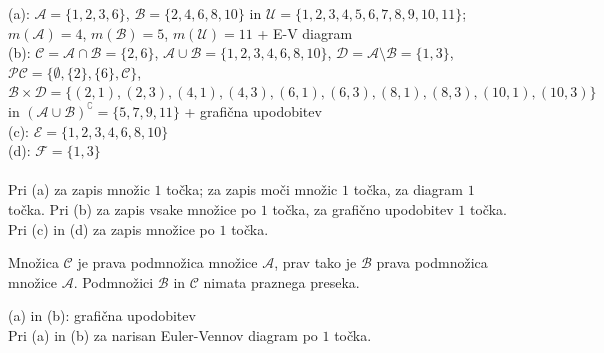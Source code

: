 \documentclass[addpoints]{exam}
\begin{document}
\begin{questions}
    \begin{solution}[12cm]
        (a): $\mathcal{A}=\{1,2,3,6\}$, $\mathcal{B}=\{2,4,6,8,10\}$ in $\mathcal{U}=\{1,2,3,4,5,6,7,8,9,10,11\}$; $m(\mathcal{A})=4$, $m(\mathcal{B})=5$, $m(\mathcal{U})=11$ + E-V diagram \\
        (b): $\mathcal{C}=\mathcal{A}\cap\mathcal{B}=\{2,6\}$, $\mathcal{A}\cup\mathcal{B}=\{1,2,3,4,6,8,10\}$, $\mathcal{D}=\mathcal{A}\setminus\mathcal{B}=\{1,3\}$, $\mathcal{PC}=\{\emptyset,\{2\},\{6\},\mathcal{C}\}$, $\mathcal{B}\times\mathcal{D}=\{(2,1),(2,3),(4,1),(4,3),(6,1),(6,3),(8,1),(8,3),(10,1),(10,3)\}$ in $(\mathcal{A}\cup\mathcal{B})^\complement=\{5,7,9,11\}$ + grafična upodobitev\\
        (c): $\mathcal{E}=\{1,2,3,4,6,8,10\}$ \\
        (d): $\mathcal{F}=\{1,3\}$ \\ \\
        Pri (a) za zapis množic $1$ točka; za zapis moči množic $1$ točka, za diagram $1$ točka. Pri (b) za zapis vsake množice po $1$ točka, za grafično upodobitev $1$ točka. Pri (c) in (d) za zapis množice po $1$ točka.
    \end{solution}


    \newpage

    \question
    Množica $\mathcal{C}$ je prava podmnožica množice $\mathcal{A}$, prav tako je $\mathcal{B}$ prava podmnožica množice $\mathcal{A}$. Podmnožici $\mathcal{B}$ in $\mathcal{C}$ nimata praznega preseka.

    \begin{solution}[8cm]
        (a) in (b): grafična upodobitev \\
        Pri (a) in (b) za narisan Euler-Vennov diagram po $1$ točka.
    \end{solution}





\end{questions}
\end{document}
